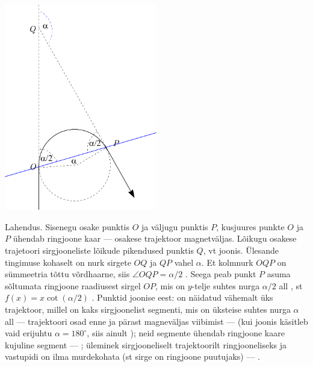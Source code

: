 \solu
\vspace{-10pt}
  \begin{center}
    \includegraphics[width=0.5\textwidth]{2020-v2g-09-sol.pdf}
  \end{center}
  \vspace{-10pt}
Lahendus. Sisenegu osake punktis $O$ ja väljugu punktis $P$, kusjuures punkte $O$ ja $P$ ühendab ringjoone kaar --- osakese trajektoor magnetväljas. Lõikugu osakese trajetoori sirgjooneliste lõikude pikendused punktis $Q$, vt joonis. Ülesande tingimuse kohaselt on nurk sirgete $OQ$ ja $QP$ vahel $\alpha$. Et kolmnurk $OQP$ on sümmeetria tõttu võrdhaarne, siis $\angle OQP=\alpha/2$  . Seega peab punkt $P$ asuma sõltumata ringjoone raadiusest sirgel $OP$, mis on $y$-telje suhtes nurga $\alpha/2$ all  , st $f(x)=x\cot(\alpha/2)$  . Punktid joonise eest: on näidatud vähemalt üks trajektoor, millel on kaks sirgjoonelist segmenti, mis on üksteise suhtes nurga $\alpha$ all --- trajektoori osad enne ja pärast magneväljas viibimist ---  (kui joonis käsitleb vaid erijuhtu $\alpha=180^\circ$, siis ainult ); neid segmente ühendab ringjoone kaare kujuline segment --- ; üleminek sirgjooneliselt trajektoorilt ringjooneliseks ja vastupidi on ilma murdekohata (st sirge on ringjoone puutujaks) --- .

\vspace{10pt}
\probend